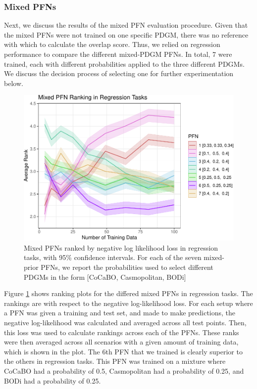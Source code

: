 \documentclass[12pt,twoside]{reedthesis}
\begin{document}
\hypertarget{mixedPFNEvalResults}{%
\subsubsection{Mixed PFNs}\label{mixedPFNEvalResults}}

Next, we discuss the results of the mixed PFN evaluation procedure. Given that the mixed PFNs were not trained on one specific PDGM, there was no reference with which to calculate the overlap score. Thus, we relied on regression performance to compare the different mixed-PDGM PFNs. In total, 7 were trained, each with different probabilities applied to the three different PDGMs. We discuss the decision process of selecting one for further experimentation below.
\begin{figure}
\centering
\includegraphics{thesis_files/figure-latex/mixed-pfn-eval-regression-1.pdf}
\caption{\label{fig:mixed-pfn-eval-regression}Mixed PFNs ranked by negative log likelihood loss in regression tasks, with 95\% confidence intervals. For each of the seven mixed-prior PFNs, we report the probabilities used to select different PDGMs in the form {[}CoCaBO, Casmopolitan, BODi{]}}
\end{figure}
Figure \ref{fig:mixed-pfn-eval-regression} shows ranking plots for the differed mixed PFNs in regression tasks. The rankings are with respect to the negative log-likelihood loss. For each setup where a PFN was given a training and test set, and made to make predictions, the negative log-likelihood was calculated and averaged across all test points. Then, this loss was used to calculate rankings across each of the PFNs. These ranks were then averaged across all scenarios with a given amount of training data, which is shown in the plot. The 6th PFN that we trained is clearly superior to the others in regression tasks. This PFN was trained on a mixture where CoCaBO had a probability of 0.5, Casmopolitan had a probability of 0.25, and BODi had a probability of 0.25.
\end{document}
